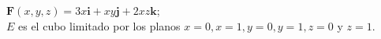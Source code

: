 \item $\mathbf{F}(x, y, z) = 3x\mathbf{i} + xy\mathbf{j} + 2xz\mathbf{k}$;\\
    $E$ es el cubo limitado por los planos $x = 0, x = 1, y = 0, y = 1, z = 0$ y $z = 1$.
